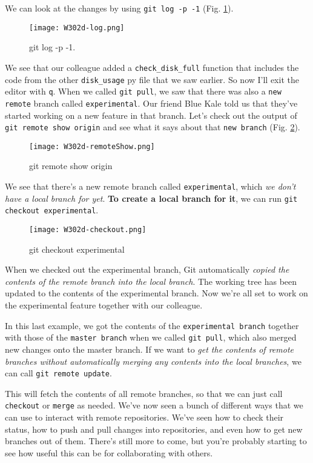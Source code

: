 	We can look at the changes by using \verb|git log -p -1| (Fig. \ref{W302d-log}).
	
	\begin{figure} 
		\caption{git log -p -1.}
		\centering
		\texttt{[image: W302d-log.png]}
		\label{W302d-log}
	\end{figure}
	
	We see that our colleague added a \verb|check_disk_full| function that includes the code from the other \verb|disk_usage| py file that we saw earlier. 
	So now I'll exit the editor with \verb|q|. When we called \verb|git pull|, we saw that there was also a \verb|new remote| branch called \verb|experimental|. Our friend Blue Kale told us that they've started working on a new feature in that branch. Let's check out the output of \verb|git remote show origin| and see what it says about that \verb|new branch| (Fig. \ref{W302d-remoteShow}).
	
	\begin{figure} 
		\caption{git remote show origin}
		\centering
		\texttt{[image: W302d-remoteShow.png]}
		\label{W302d-remoteShow}
	\end{figure}
	
	We see that there's a new remote branch called \verb|experimental|, which \textit{we don't have a local branch for yet}. \textbf{To create a local branch for it}, we can run \verb|git checkout experimental|.
	
	\begin{figure} 
		\caption{git checkout experimental}
		\centering
		\texttt{[image: W302d-checkout.png]}
		\label{W302d-checkout}
	\end{figure}
	
	When we checked out the experimental branch, Git automatically \textit{copied the contents of the remote branch into the local branch}. The working tree has been updated to the contents of the experimental branch. Now we're all set to work on the experimental feature together with our colleague. 
	
	In this last example, we got the contents of the \verb|experimental branch| together with those of the \verb|master branch| when we called \verb|git pull|, which also merged new changes onto the master branch. If we want to \textit{get the contents of remote branches without automatically merging any contents into the local branches}, we can call \verb|git remote update|. 
	
	This will fetch the contents of all remote branches, so that we can just call \verb|checkout| or \verb|merge| as needed. We've now seen a bunch of different ways that we can use to interact with remote repositories. We've seen how to check their status, how to push and pull changes into repositories, and even how to get new branches out of them. 
	There's still more to come, but you're probably starting to see how useful this can be for collaborating with others.
	
